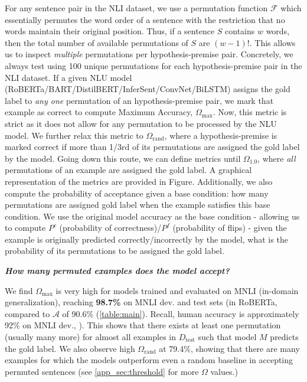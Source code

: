 \documentclass[12pt]{article}
\newcommand{\xit}[1]{{\noindent\textbf{\textit{#1}}}}
\begin{document}
For any sentence pair in the NLI dataset, we use a permutation function $\mathcal{F}$ which essentially permutes the word order of a sentence with the restriction that no words maintain their original position. Thus, if a sentence $S$ contains $w$ words, then the total number of available permutations of $S$ are $(w-1)!$. This allows us to inspect \textit{multiple} permutations per hypothesis-premise pair. Concretely, we always test using 100 unique permutations for each hypothesis-premise pair in the NLI dataset. If a given NLU model (RoBERTa/BART/DistilBERT/InferSent/ConvNet/BiLSTM) assigns the gold label to \textit{any one} permutation of an hypothesis-premise pair, we mark that example as correct to compute Maximum Accuracy, $\Omega_{\text{max}}$. Now, this metric is strict as it does not allow for any permutation to be processed by the NLU model. We further relax this metric to $\Omega_{\text{rand}}$, where a hypothesis-premise is marked correct if more than 1/3rd of its permutations are assigned the gold label by the model. Going down this route, we can define metrics until $\Omega_{1.0}$, where \textit{all} permutations of an example are assigned the gold label. A graphical representation of the metrics are provided in Figure. Additionally, we also compute the probability of acceptance given a base condition: how many permutations are assigned gold label when the example satisfies this base condition. We use the original model accuracy as the base condition - allowing us to compute $P^{c}$ (probability of correctness)/$P^{f}$ (probability of flips) - given the example is originally predicted correctly/incorrectly by the model, what is the probability of its permutations to be assigned the gold label.

\xit{How many permuted examples does the model accept?}

We find $\Omega_{\text{max}}$ is very high for models trained and evaluated on MNLI (in-domain generalization), reaching \textbf{98.7\%} on MNLI dev. and test sets (in RoBERTa, compared to $\mathcal{A}$ of 90.6\% (\autoref{table:main}). Recall, human accuracy is approximately 92\% on MNLI dev.,  \citealt{nangia-bowman-2019-human}). This shows that there exists at least one permutation (usually many more) for almost all examples in $D_{\text{test}}$ such that model $M$ predicts the gold label. We also observe high $\Omega_{\text{rand}}$ at 79.4\%, showing that there are many examples for which the models outperform even a random baseline in accepting permuted sentences (see \autoref{app_sec:threshold} for more $\Omega$ values.)
\end{document}

